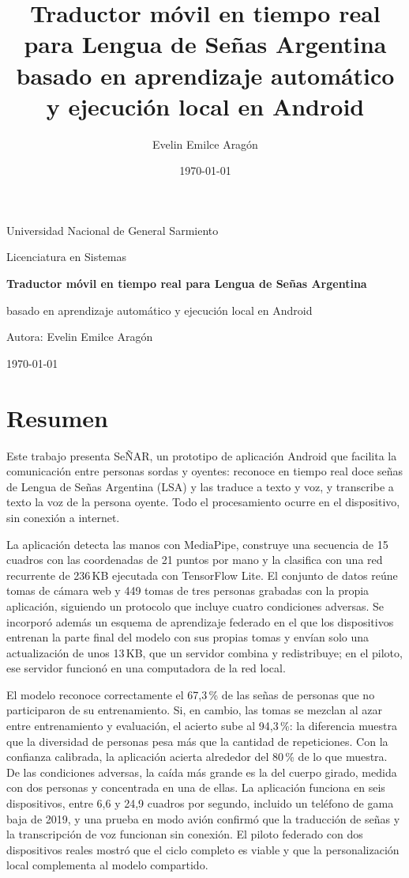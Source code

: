 \documentclass[12pt,a4paper,oneside]{report}
\title{Traductor móvil en tiempo real para Lengua de Señas Argentina basado en aprendizaje automático y ejecución local en Android}
\author{Evelin Emilce Aragón}
\date{\today}
\begin{document}
\begin{titlepage}
    \centering
    {\Large Universidad Nacional de General Sarmiento\par}
    \vspace{1.5cm}
    {\large Licenciatura en Sistemas\par}
    \vspace{2.5cm}
    {\Huge\bfseries Traductor móvil en tiempo real para Lengua de Señas Argentina\par}
    \vspace{0.4cm}
    {\Large basado en aprendizaje automático y ejecución local en Android\par}
    \vspace{2.5cm}
    {\large Autora: Evelin Emilce Aragón\par}
    \vspace{0.3cm}
    \vfill
    {\large \today\par}
\end{titlepage}


\chapter*{Resumen}
Este trabajo presenta SeÑAR, un prototipo de aplicación Android que facilita la comunicación entre personas sordas y oyentes: reconoce en tiempo real doce señas de Lengua de Señas Argentina (LSA) y las traduce a texto y voz, y transcribe a texto la voz de la persona oyente. Todo el procesamiento ocurre en el dispositivo, sin conexión a internet.

La aplicación detecta las manos con MediaPipe, construye una secuencia de 15 cuadros con las coordenadas de 21 puntos por mano y la clasifica con una red recurrente de 236\,KB ejecutada con TensorFlow Lite. El conjunto de datos reúne tomas de cámara web y 449 tomas de tres personas grabadas con la propia aplicación, siguiendo un protocolo que incluye cuatro condiciones adversas. Se incorporó además un esquema de aprendizaje federado en el que los dispositivos entrenan la parte final del modelo con sus propias tomas y envían solo una actualización de unos 13\,KB, que un servidor combina y redistribuye; en el piloto, ese servidor funcionó en una computadora de la red local.

El modelo reconoce correctamente el 67,3\,\% de las señas de personas que no participaron de su entrenamiento. Si, en cambio, las tomas se mezclan al azar entre entrenamiento y evaluación, el acierto sube al 94,3\,\%: la diferencia muestra que la diversidad de personas pesa más que la cantidad de repeticiones. Con la confianza calibrada, la aplicación acierta alrededor del 80\,\% de lo que muestra. De las condiciones adversas, la caída más grande es la del cuerpo girado, medida con dos personas y concentrada en una de ellas. La aplicación funciona en seis dispositivos, entre 6,6 y 24,9 cuadros por segundo, incluido un teléfono de gama baja de 2019, y una prueba en modo avión confirmó que la traducción de señas y la transcripción de voz funcionan sin conexión. El piloto federado con dos dispositivos reales mostró que el ciclo completo es viable y que la personalización local complementa al modelo compartido.
\end{document}
